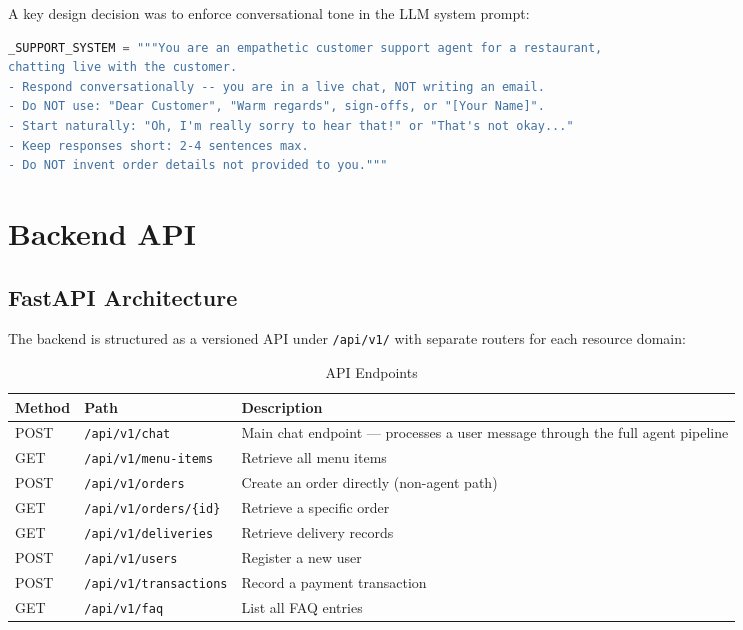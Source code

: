 \documentclass[12pt,a4paper]{report}
\begin{document}
A key design decision was to enforce conversational tone in the LLM system prompt:

\begin{lstlisting}[language=Python, caption={Support agent system prompt excerpt}]
_SUPPORT_SYSTEM = """You are an empathetic customer support agent for a restaurant,
chatting live with the customer.
- Respond conversationally -- you are in a live chat, NOT writing an email.
- Do NOT use: "Dear Customer", "Warm regards", sign-offs, or "[Your Name]".
- Start naturally: "Oh, I'm really sorry to hear that!" or "That's not okay..."
- Keep responses short: 2-4 sentences max.
- Do NOT invent order details not provided to you."""
\end{lstlisting}

\chapter{Backend API}\label{ch:api}

\section{FastAPI Architecture}

The backend is structured as a versioned API under \texttt{/api/v1/} with separate
routers for each resource domain:

\begin{table}[H]
\centering
\caption{API Endpoints}
\begin{tabularx}{\textwidth}{llX}
\toprule
\textbf{Method} & \textbf{Path} & \textbf{Description} \\
\midrule
POST & \texttt{/api/v1/chat}          & Main chat endpoint — processes a user message through the full agent pipeline \\
GET  & \texttt{/api/v1/menu-items}    & Retrieve all menu items \\
POST & \texttt{/api/v1/orders}        & Create an order directly (non-agent path) \\
GET  & \texttt{/api/v1/orders/\{id\}} & Retrieve a specific order \\
GET  & \texttt{/api/v1/deliveries}    & Retrieve delivery records \\
POST & \texttt{/api/v1/users}         & Register a new user \\
POST & \texttt{/api/v1/transactions}  & Record a payment transaction \\
GET  & \texttt{/api/v1/faq}           & List all FAQ entries \\
\bottomrule
\end{tabularx}
\end{table}
\end{document}
